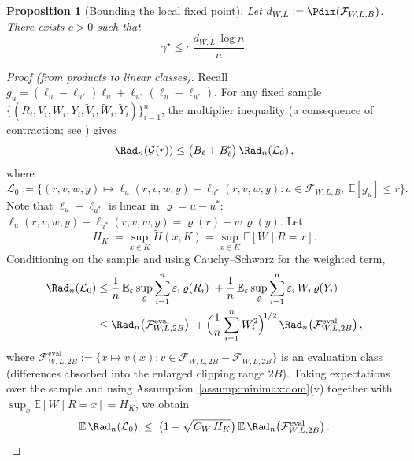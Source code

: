 \documentclass[pdflatex,sn-mathphys-ay]{sn-jnl}%
\numberwithin{equation}{section}
\theoremstyle{thmstyleone}%
\newtheorem{proposition}[theorem]{Proposition}%
\theoremstyle{thmstyletwo}%
\theoremstyle{thmstylethree}%
\begin{document}
\begin{proposition}[Bounding the local fixed point]\label{prop:minimax:lrc}
Let \(d_{W,L}:=\Pdim(\mathcal{F}_{W,L,B})\).  There exists \(c>0\) such that
\begin{equation}\label{eq:minimax:lrc}
\gamma^\star \le c\,\frac{d_{W,L}\,\log n}{n}.
\end{equation}
\end{proposition}

\begin{proof}[Proof (from products to linear classes)]
Recall \(g_u=(\ell_u-\ell_{u^*})\ell_u + \ell_{u^*}(\ell_u-\ell_{u^*})\).  For any fixed sample \(\{(R_i,V_i,W_i,Y_i,\tilde V_i,\tilde W_i,\tilde Y_i)\}_{i=1}^n\), the multiplier inequality (a consequence of contraction; see \cite[Sec.~2--3]{bartlett2005local}) gives
\begin{equation}\label{eq:mult}
\Rad_n(\mathcal{G}(r)) \le \big(B_\ell+B_\ell^{\!*}\big)\,\Rad_n\!\left(\mathcal{L}_0\right),
\end{equation}
where 
\[
\mathcal{L}_0:=\big\{(r,v,w,y)\mapsto \ell_u(r,v,w,y)-\ell_{u^*}(r,v,w,y): u\in\mathcal{F}_{W,L,B},\ \mathbb{E}[g_u]\le r\big\}.
\]
Note that \(\ell_u-\ell_{u^*}\) is linear in \(\varrho=u-u^*\):
\(
\ell_u(r,v,w,y)-\ell_{u^*}(r,v,w,y)=\varrho(r)-w\,\varrho(y).
\)
Let
\[
H_K := \sup_{x\in K} \tilde H(x,K) = \sup_{x\in K} \mathbb{E}[W\mid R=x].
\]
Conditioning on the sample and using Cauchy--Schwarz for the weighted term,
\begin{align}
\Rad_n(\mathcal{L}_0)
&\le \frac{1}{n}\,\mathbb{E}_\varepsilon\sup_{\varrho}\sum_{i=1}^n \varepsilon_i\,\varrho(R_i)
\;+
\frac{1}{n}\,\mathbb{E}_\varepsilon\sup_{\varrho}\sum_{i=1}^n \varepsilon_i\,W_i\,\varrho(Y_i)\\
&\le \Rad_n\!\left(\mathcal{F}_{W,L,2B}^{\mathrm{eval}}\right)
\;+
\Big(\frac{1}{n}\sum_{i=1}^n W_i^2\Big)^{\!1/2}\,\Rad_n\!\left(\mathcal{F}_{W,L,2B}^{\mathrm{eval}}\right),
\label{eq:eval-weighted-split}
\end{align}
where \(\mathcal{F}_{W,L,2B}^{\mathrm{eval}}:=\{x\mapsto v(x): v\in\mathcal{F}_{W,L,2B}-\mathcal{F}_{W,L,2B}\}\) is an evaluation class (differences absorbed into the enlarged clipping range \(2B\)). Taking expectations over the sample and using Assumption~\ref{assump:minimax:dom}(v) together with \(\sup_x \mathbb{E}[W\mid R=x]=H_K\), we obtain
\begin{equation}\label{eq:weighted-factor}
\mathbb{E}\,\Rad_n(\mathcal{L}_0) \;\le\; \big(1+\sqrt{C_W\,H_K}\big)\,\mathbb{E}\,\Rad_n\!\left(\mathcal{F}_{W,L,2B}^{\mathrm{eval}}\right).

\end{equation}
\end{proof}
\end{document}
